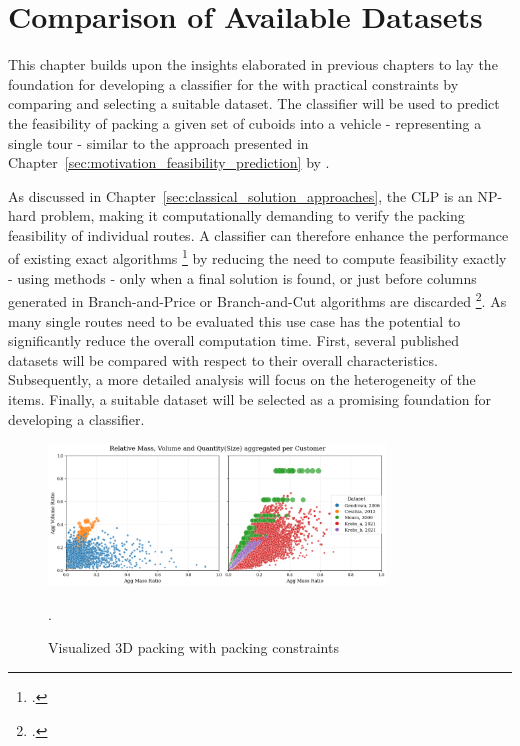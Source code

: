 \chapter{Comparison of Available Datasets}
\label{sec:dataset_selection}

This chapter builds upon the insights elaborated in previous chapters to lay the foundation
for developing a classifier for the  with practical constraints by comparing and
selecting a suitable dataset. The classifier will be used to predict the feasibility of packing a
given set of cuboids into a vehicle - representing a single tour - similar to the approach presented
in Chapter~\ref{sec:motivation_feasibility_prediction} by \citeauthor{zhang_learning-based_2022}.

As discussed in Chapter~\ref{sec:classical_solution_approaches}, the \gls{CLP} is an NP-hard problem,
making it computationally demanding to verify the packing feasibility of individual routes.
A classifier can therefore enhance the performance of existing exact algorithms \footcite[cf.][]{tamke_branch-and-cut_2024}
by reducing the need to compute feasibility exactly - using  methods - only when a
final solution is found, or just before columns generated in Branch-and-Price or Branch-and-Cut
algorithms are discarded \footcite[cf.][pp. 9--11]{zhang_learning-based_2022}. As many single routes
need to be evaluated this use case has the potential to significantly reduce the overall
computation time. First, several published  datasets will be compared with respect
to their overall characteristics. Subsequently, a more detailed analysis will focus on the
heterogeneity of the items. Finally, a suitable dataset will be selected as a promising foundation
for developing a classifier.



\begin{figure}[ht]
    \centering
    \includegraphics[width=0.8\textwidth]{pictures/comparison_datasets_3lcvrp.png}
    \caption{Visualized 3D packing with packing constraints}.
    \label{fig:dataset_comparison}
\end{figure}


